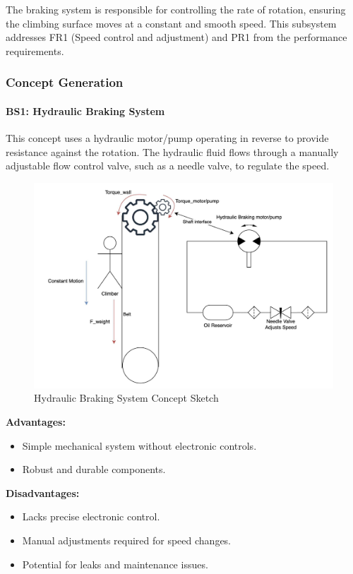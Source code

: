 The braking system is responsible for controlling the rate of rotation, ensuring the climbing surface moves at a constant and smooth speed. This subsystem addresses FR1 (Speed control and adjustment) and PR1 from the performance requirements.

\subsubsection{Concept Generation}

\paragraph{BS1: Hydraulic Braking System}

This concept uses a hydraulic motor/pump operating in reverse to provide resistance against the rotation. The hydraulic fluid flows through a manually adjustable flow control valve, such as a needle valve, to regulate the speed.

\begin{figure}[H]
    \centering
    \includegraphics[width=0.6\linewidth]{figs/concept_design/hydraulic_brake_concept.png}
    \caption{Hydraulic Braking System Concept Sketch}
    \label{fig:hydraulic-brake-concept}
\end{figure}

\textbf{Advantages:}
\begin{itemize}
    \item Simple mechanical system without electronic controls.
    \item Robust and durable components.
\end{itemize}

\textbf{Disadvantages:}
\begin{itemize}
    \item Lacks precise electronic control.
    \item Manual adjustments required for speed changes.
    \item Potential for leaks and maintenance issues.
\end{itemize}


